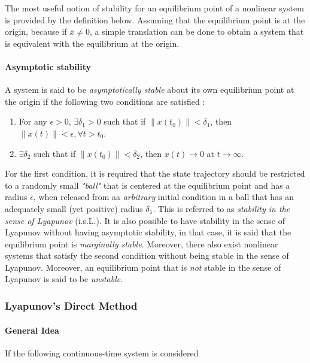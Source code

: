 \documentclass{thesisreport}
\begin{document}
The most useful notion of stability for an equilibrium point of a nonlinear system is provided by the definition below. Assuming that the equilibrium point is at the origin, because if $\overline{x} \neq 0$, a simple translation can be done to obtain a system that is equivalent with the equilibrium at the origin.

\paragraph{Asymptotic stability} A system is said to be \textit{asymptotically stable} about its own equilibrium point at the origin if the following two conditions are satisfied \cite{Dahleh2011}:

\begin{enumerate}
	\item For any $\epsilon > 0$, $\exists \delta_1 > 0$ such that if $\| x(t_0)\|<\delta_1$, then $\|x(t)\|<\epsilon, \forall t>t_0$.
	\item $\exists \delta_2$ such that if $\|x(t_0)\|<\delta_2$, then $x(t)\rightarrow 0$ at $t \rightarrow \infty$.
\end{enumerate}

For the first condition, it is required that the state trajectory should be restricted to a randomly small \textit{"ball"} that is centered at the equilibrium point and has a radius $\epsilon$, when released from aa \textit{arbitrary} initial condition in a ball that has an adequately small (yet positive) radius $\delta_1$. This is referred to as \textit{stability in the sense of Lyapunov} (i.s.L.). It is also possible to have stability in the sense of Lyapunov without having asymptotic stability, in that case, it is said that the equilibrium point is \textit{marginally stable}. Moreover, there also exist nonlinear systems that satisfy the second condition without being stable in the sense of Lyapunov. Moreover, an equilibrium point that is \textit{not} stable in the sense of Lyapunov is said to be \textit{unstable}.

\subsubsection{Lyapunov's Direct Method}

\paragraph{General Idea}

If the following continuous-time system is considered
\end{document}
